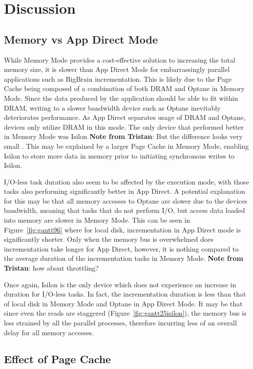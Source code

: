 \documentclass[conference]{IEEEtran}
\newcommand{\bigbrain}{BigBrain }
\newcommand{\tristan}[1]{\color{orange}\textbf{Note from Tristan}:
      #1 \color{black}}
\begin{document}
\section{Discussion}
\subsection{Memory vs App Direct Mode}

While Memory Mode provides a cost-effective solution to increasing the total memory
size, it is slower than App Direct Mode for embarrassingly parallel applications such
as \bigbrain incrementation. This is likely due to the Page Cache being composed of a
combination of both DRAM and Optane in Memory Mode. Since the data produced by the application should be
able to fit within DRAM, writing to a slower bandwidth device such as Optane inevitably
deteriorates performance. As App Direct separates usage of DRAM and Optane, devices only utilize DRAM in this mode.
The only device that performed better in Memory Mode was 
Isilon \tristan{But the difference looks very small}. This may be explained by a larger Page Cache in Memory Mode, enabling Isilon to
store more data in memory prior to initiating synchronous writes to Isilon.

I/O-less task duration also seem to be affected by the execution mode, with those tasks
also performing significantly better in App Direct. A potential explanation for this may be 
that all memory accesses to Optane are slower due to the devices bandwidth, meaning that
tasks that do not perform I/O, but access data loaded into memory are slower in Memory Mode.
This can be seen in Figure~\ref{fig:gantt96} where for local disk, incrementation in App Direct
mode is significantly shorter. Only when the memory bus is overwhelmed does incrementation take
longer for App Direct, however, it is nothing compared to the average duration of the incrementation
tasks in Memory Mode. \tristan{how about throttling?}

Once again, Isilon is the only device which does not experience an increase in duration for
I/O-less tasks. In fact, the incrementation duration is less than that of local disk in Memory Mode
and Optane in App Direct Mode. It may be that since even the reads are staggered
(Figure~\ref{fig:gantt25isilon}), the memory bus is less strained by all the parallel processes,
therefore incurring less of an overall delay for all memory accesses.


\subsection{Effect of Page Cache}
\end{document}
